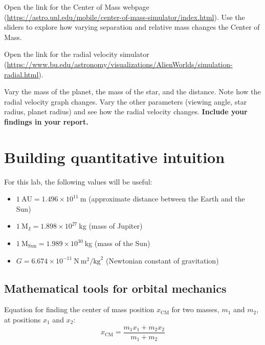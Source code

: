 \begin{steps}
	\item Open the link for the Center of Mass webpage (\url{https://astro.unl.edu/mobile/center-of-mass-simulator/index.html}). Use the sliders to explore how varying separation and relative mass changes the Center of Mass.
	
	\item Open the link for the radial velocity simulator (\url{https://www.bu.edu/astronomy/visualizations/AlienWorlds/simulation-radial.html}).
		
	\item Vary the mass of the planet, the mass of the star, and the distance. Note how the radial velocity graph changes. Vary the other parameters (viewing angle, star radius, planet radius) and see how the radial velocity changes. \textbf{Include your findings in your report.}		
\end{steps}

\section{Building quantitative intuition}

For this lab, the following values will be useful:
\begin{itemize}
	\item $1\:\textrm{AU} = 1.496 \times 10^{11}\:$m (approximate distance between the Earth and the Sun)
	
	\item $1\:\textrm{M}_\textrm{J} = 1.898 \times 10^{27}\:$kg (mass of Jupiter)
	
	\item $1\:\textrm{M}_\textrm{Sun} = 1.989 \times 10^{30}\:$kg (mass of the Sun)
	
	\item $G = 6.674 \times 10^{-11}\:\mathrm{N}\:\mathrm{m}^2/\mathrm{kg}^2$ (Newtonian constant of gravitation)
\end{itemize}

\subsection{Mathematical tools for orbital mechanics}

Equation for finding the center of mass position $x_\mathrm{CM}$ for two masses, $m_1$ and $m_2$, at positions $x_1$ and $x_2$:
\begin{equation}
 x_\mathrm{CM} = \frac{m_1 x_1 + m_2 x_2}{m_1 + m_2}
\end{equation}


